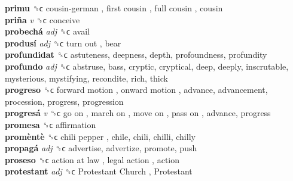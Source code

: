 \textbf{primu} ␝ϲ   cousin-german ,  first cousin ,  full cousin , cousin  \\
\textbf{priña} \emph{v}  ␝ϲ  conceive  \\
\textbf{probechá} \emph{adj}  ␝ϲ  avail  \\
\textbf{produsí} \emph{adj}  ␝ϲ   turn out , bear  \\
\textbf{profundidat} ␝ϲ  astuteness, deepness, depth, profoundness, profundity  \\
\textbf{profundo} \emph{adj}  ␝ϲ  abstruse, bass, cryptic, cryptical, deep, deeply, inscrutable, mysterious, mystifying, recondite, rich, thick  \\
\textbf{progreso} ␝ϲ   forward motion ,  onward motion , advance, advancement, procession, progress, progression  \\
\textbf{progresá} \emph{v}  ␝ϲ   go on ,  march on ,  move on ,  pass on , advance, progress  \\
\textbf{promesa} ␝ϲ  affirmation  \\
\textbf{promèntè} ␝ϲ   chili pepper , chile, chili, chilli, chilly  \\
\textbf{propagá} \emph{adj}  ␝ϲ  advertise, advertize, promote, push  \\
\textbf{proseso} ␝ϲ   action at law ,  legal action , action  \\
\textbf{protestant} \emph{adj}  ␝ϲ   Protestant Church ,  Protestant   \\
